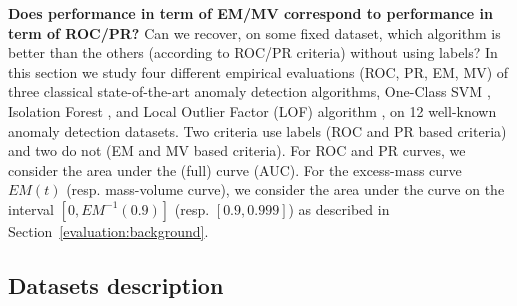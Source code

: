 \textbf{Does performance in term of EM/MV correspond to performance in term of ROC/PR?} Can we recover, on some fixed dataset, which algorithm is better than the others (according to ROC/PR criteria) without using labels?
In this section we study four different empirical evaluations (ROC, PR, EM, MV) of three classical state-of-the-art anomaly detection algorithms, One-Class SVM  \citep{Scholkopf2001}, Isolation Forest \citep{Liu2008}, and Local Outlier Factor (LOF) algorithm \citep{Breunig2000LOF}, on 12 well-known anomaly detection datasets. Two criteria use labels (ROC and PR based criteria) and two do not (EM and MV based criteria).
For ROC and PR curves, we consider the area under the (full) curve (AUC). For the excess-mass curve $EM(t)$ (resp. mass-volume curve), we consider the area under the curve on the interval $[0, EM^{-1}(0.9)]$ (resp. $[0.9, 0.999]$) as described in Section~\ref{evaluation:background}.

\subsection{Datasets description}

